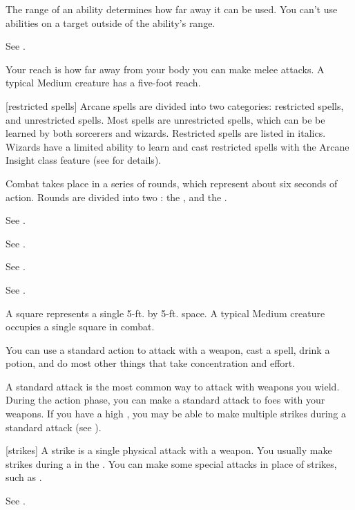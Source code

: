  The range of an ability determines how far away it can be used.
You can't use abilities on a target outside of the ability's range.

 See .

 Your reach is how far away from your body you can make melee attacks.
A typical Medium creature has a five-foot reach.

[restricted spells] Arcane spells are divided into two categories: restricted spells, and unrestricted spells. Most spells are unrestricted spells, which can be be learned by both sorcerers and wizards. Restricted spells are listed in italics. Wizards have a limited ability to learn and cast restricted spells with the Arcane Insight class feature (see  for details).

 Combat takes place in a series of rounds, which represent about six seconds of action.
Rounds are divided into two : the , and the .

 See .

 See .

 See .

 See .

 A square represents a single 5-ft. by 5-ft. space.
A typical Medium creature occupies a single square in combat.

 You can use a standard action to attack with a weapon, cast a spell, drink a potion, and do most other things that take concentration and effort.

 A standard attack is the most common way to attack with weapons you wield.
During the action phase, you can make a standard attack to  foes with your weapons.
If you have a high , you may be able to make multiple strikes during a standard attack (see ).

[strikes] A strike is a single physical attack with a weapon.
You usually make strikes during a  in the .
You can make some special attacks in place of strikes, such as .

 See .

